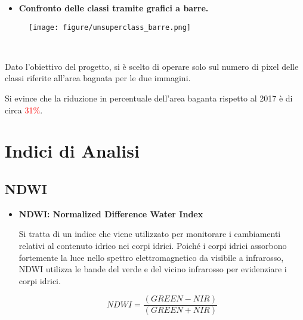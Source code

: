 \documentclass[10pt]{beamer}
\begin{document}
\begin{frame} {}
    \begin{itemize}
       \item \textbf{Confronto delle classi tramite grafici a barre.}
    \end{itemize}
    \begin{figure}
      \centering
      \bigskip 
      \texttt{[image: figure/unsuperclass\_barre.png]}
    \end{figure}
\end{frame}


\begin{frame} {}
    \begin{mybox}
      \tiny
   \end{mybox}
      \bigskip 
      \centering
      \\{Dato l'obiettivo del progetto, si è scelto di operare solo sul numero di pixel delle classi riferite all'area bagnata per le due immagini.\par} 
      \bigskip 
      {Si evince che la riduzione in percentuale dell'area baganta rispetto al 2017 è di circa \textcolor{red}{\large 31\%}.\par}
\end{frame}


\section {Indici di Analisi}
\subsection {NDWI}
\begin{frame} 
    \begin{itemize}
      \item \textbf{NDWI: Normalized Difference Water Index}
      \\{\scriptsize Si tratta di un indice che viene utilizzato per monitorare i cambiamenti relativi al contenuto idrico nei corpi idrici. Poiché i corpi idrici assorbono fortemente la luce nello spettro elettromagnetico da visibile a infrarosso, NDWI utilizza le bande del verde e del vicino infrarosso per evidenziare i corpi idrici.\par} 
    \begin{equation}
       NDWI={\frac{(GREEN - NIR)}{(GREEN + NIR)}}
    \end{equation}
    \begin{mybox}
       \tiny
    \end{mybox}
    \end{itemize}
\end{frame}
\end{document}
